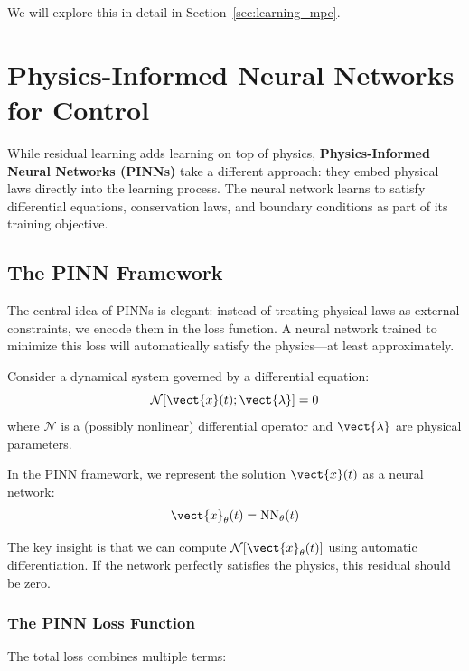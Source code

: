 We will explore this in detail in Section~\ref{sec:learning_mpc}.

\section{Physics-Informed Neural Networks for Control}
\label{sec:pinns}

While residual learning adds learning on top of physics, \textbf{Physics-Informed Neural Networks (PINNs)} take a different approach: they embed physical laws directly into the learning process. The neural network learns to satisfy differential equations, conservation laws, and boundary conditions as part of its training objective.

\subsection{The PINN Framework}

The central idea of PINNs is elegant: instead of treating physical laws as external constraints, we encode them in the loss function. A neural network trained to minimize this loss will automatically satisfy the physics---at least approximately.

Consider a dynamical system governed by a differential equation:
\begin{equation}
\mathcal{N}[\vect{x}(t); \vect{\lambda}] = 0
\label{eq:governing_equation}
\end{equation}
where $\mathcal{N}$ is a (possibly nonlinear) differential operator and $\vect{\lambda}$ are physical parameters.

In the PINN framework, we represent the solution $\vect{x}(t)$ as a neural network:
\begin{equation}
\vect{x}_\theta(t) = \text{NN}_\theta(t)
\end{equation}

The key insight is that we can compute $\mathcal{N}[\vect{x}_\theta(t)]$ using automatic differentiation. If the network perfectly satisfies the physics, this residual should be zero.

\subsubsection{The PINN Loss Function}

The total loss combines multiple terms:

